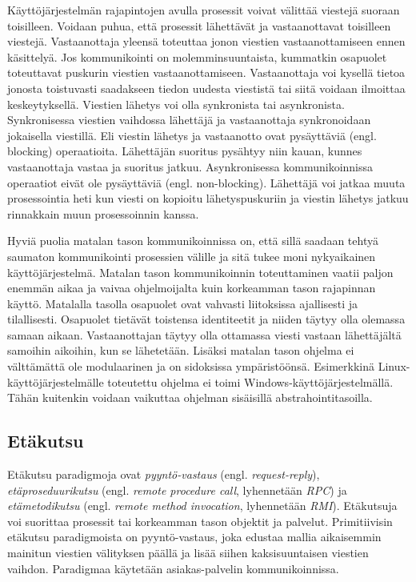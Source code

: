 Käyttöjärjestelmän rajapintojen avulla prosessit voivat välittää viestejä suoraan toisilleen. Voidaan puhua, että prosessit lähettävät ja vastaanottavat toisilleen viestejä. Vastaanottaja yleensä toteuttaa jonon viestien vastaanottamiseen ennen käsittelyä. Jos kommunikointi on molemminsuuntaista, kummatkin osapuolet toteuttavat puskurin viestien vastaanottamiseen. Vastaanottaja voi kysellä tietoa jonosta toistuvasti saadakseen tiedon uudesta viestistä tai siitä voidaan ilmoittaa keskeytyksellä. Viestien lähetys voi olla synkronista tai asynkronista. Synkronisessa viestien vaihdossa lähettäjä ja vastaanottaja synkronoidaan jokaisella viestillä. Eli viestin lähetys ja vastaanotto ovat pysäyttäviä (engl. blocking) operaatioita. Lähettäjän suoritus pysähtyy niin kauan, kunnes vastaanottaja vastaa ja suoritus jatkuu. Asynkronisessa kommunikoinnissa operaatiot eivät ole pysäyttäviä (engl. non-blocking). Lähettäjä voi jatkaa muuta prosessointia heti kun viesti on kopioitu lähetyspuskuriin ja viestin lähetys jatkuu rinnakkain muun prosessoinnin kanssa. \mbox{\cite[s.~147--148]{distributed-systems-concepts-and-design}}

Hyviä puolia matalan tason kommunikoinnissa on, että sillä saadaan tehtyä saumaton kommunikointi prosessien välille ja sitä tukee moni nykyaikainen käyttöjärjestelmä. Matalan tason kommunikoinnin toteuttaminen vaatii paljon enemmän aikaa ja vaivaa ohjelmoijalta kuin korkeamman tason rajapinnan käyttö. Matalalla tasolla osapuolet ovat vahvasti liitoksissa ajallisesti ja tilallisesti. Osapuolet tietävät toistensa identiteetit ja niiden täytyy olla olemassa samaan aikaan. Vastaanottajan täytyy olla ottamassa viesti vastaan lähettäjältä samoihin aikoihin, kun se lähetetään. Lisäksi matalan tason ohjelma ei välttämättä ole modulaarinen ja on sidoksissa ympäristöönsä. Esimerkkinä Linux-käyt\-tö\-jär\-jes\-tel\-mäl\-le toteutettu ohjelma ei toimi Windows-käyttöjärjestelmällä. Tähän kuitenkin voidaan vaikuttaa ohjelman sisäisillä abstrahointitasoilla.


\subsection{Etäkutsu}
\label{ch:remote-invocation}
Etäkutsu paradigmoja ovat \emph{pyyntö-vastaus} (engl. \emph{request-reply}), \emph{etäproseduurikutsu} (engl. \emph{remote procedure call}, lyhennetään \emph{RPC}) ja \emph{etämetodikutsu} (engl. \emph{remote method invocation}, lyhennetään \emph{RMI}). Etäkutsuja voi suorittaa prosessit tai korkeamman tason objektit ja palvelut. Primitiivisin etäkutsu paradigmoista on pyyntö-vastaus, joka edustaa mallia aikaisemmin mainitun viestien välityksen päällä ja lisää siihen kaksisuuntaisen viestien vaihdon. Paradigmaa käytetään asiakas-palvelin kommunikoinnissa. \mbox{\cite[s.~185--186]{distributed-systems-concepts-and-design}}

